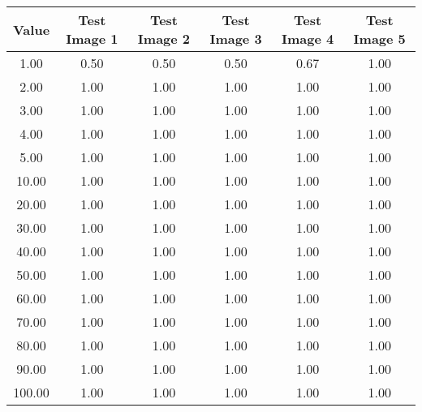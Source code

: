 \begin{tabular}{|c|c|c|c|c|c|}
\hline
\textbf{Value}&\textbf{Test Image 1}&\textbf{Test Image 2}&\textbf{Test Image 3}&\textbf{Test Image 4}&\textbf{Test Image 5}\\\hline
1.00&0.50&0.50&0.50&0.67&1.00\\\hline
2.00&1.00&1.00&1.00&1.00&1.00\\\hline
3.00&1.00&1.00&1.00&1.00&1.00\\\hline
4.00&1.00&1.00&1.00&1.00&1.00\\\hline
5.00&1.00&1.00&1.00&1.00&1.00\\\hline
10.00&1.00&1.00&1.00&1.00&1.00\\\hline
20.00&1.00&1.00&1.00&1.00&1.00\\\hline
30.00&1.00&1.00&1.00&1.00&1.00\\\hline
40.00&1.00&1.00&1.00&1.00&1.00\\\hline
50.00&1.00&1.00&1.00&1.00&1.00\\\hline
60.00&1.00&1.00&1.00&1.00&1.00\\\hline
70.00&1.00&1.00&1.00&1.00&1.00\\\hline
80.00&1.00&1.00&1.00&1.00&1.00\\\hline
90.00&1.00&1.00&1.00&1.00&1.00\\\hline
100.00&1.00&1.00&1.00&1.00&1.00\\\hline
\end{tabular}
